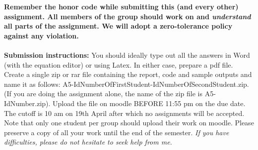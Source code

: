 \documentclass[11pt]{article}
\begin{document}
\maketitle

\textbf{Remember the honor code while submitting this (and every other) assignment. All members of the group should work on and \emph{understand} all parts of the assignment. We will adopt a \textbf{zero-tolerance policy} against any violation.}
\\
\\
\textbf{Submission instructions:} You should ideally type out all the answers in Word (with the equation editor) or using Latex. In either case, prepare a pdf file. Create a single zip or rar file containing the report, code and sample outputs and name it as follows: A5-IdNumberOfFirstStudent-IdNumberOfSecondStudent.zip. (If you are doing the assignment alone, the name of the zip file is A5-IdNumber.zip). Upload the file on moodle BEFORE 11:55 pm on the due date. The cutoff is 10 am on 19th April after which no assignments will be accepted. Note that only one student per group should upload their work on moodle. Please preserve a copy of all your work until the end of the semester. \emph{If you have difficulties, please do not hesitate to seek help from me.} 
\end{document}
